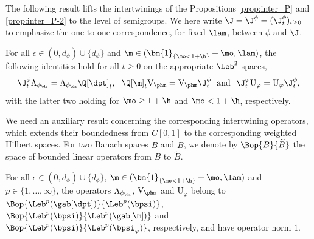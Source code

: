 The following result lifts the intertwinings of the Propositions \ref{prop:inter_P} and \ref{prop:inter_P-2} to the level of semigroups. We here write $\J=\J^\phi = (\J_t^\phi)_{t \geq 0}$ to emphasize the one-to-one correspondence, for fixed $\lam$, between $\phi$ and $\J$.

\begin{proposition}
\label{prop:intertwining}
For all $\epsilon \in (0,d_\phi) \cup \{d_\phi\}$ and $\m \in (\bm{1}_{\{\mo < 1+\h\}}+\mo,\lam)$,
the following identities hold for all $t \geq 0$ on the appropriate $\Leb^2$-spaces,
\begin{equation}
\label{eq:inter-right-d0}
\J_t^\phi \Lambda_{\phi_{\dz}} = \Lambda_{\phi_{\dz}} \Q[\dpt]_t, \ \ \Q[\m]_t \mathrm{V}_{\phm} = \mathrm{V}_{\phm} \J_t^\phi \ \ \text{and} \ \ \J_t^\varphi {\mathrm{U}}_\varphi = {\mathrm{U}}_\varphi \J_t^\phi,
\end{equation}
with the latter two holding for $\mo \geq 1+\h$ and $\mo < 1+\h$, respectively.
\end{proposition}

We need an auxiliary result concerning the corresponding intertwining operators, which extends their boundedness from $C[0,1]$ to the corresponding weighted Hilbert spaces. For two Banach spaces $B$ and $\widetilde{B}$, we denote by $\Bop{B}{\widetilde{B}}$ the space of bounded linear operators from $B$ to $\widetilde{B}$.

\begin{lemma}
\label{lem:Lambda-L2-bounded}
For all $\epsilon \in (0,d_\phi) \cup \{d_\phi\}$, $\m \in (\bm{1}_{\{\mo < 1+\h\}} + \mo, \lam)$ and
$p \in \{1,\ldots,\infty\}$, the operators $\Lambda_{\phi_{\dz}}$, $\mathrm{V}_{\phm}$ and $\mathrm{U}_\varphi$ belong to $\Bop{\Leb^p(\gab[\dpt])}{\Leb^p(\bpsi)}$, $\Bop{\Leb^p(\bpsi)}{\Leb^p(\gab[\m])}$ and $\Bop{\Leb^p(\bpsi)}{\Leb^p(\bpsi_\varphi)}$, respectively, and have operator norm $1$.
\end{lemma}

